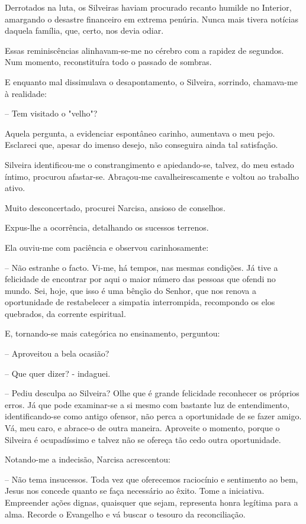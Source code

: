 \documentclass[portuguese,12pt,a4paper]{scrbook}
\begin{document}
	
	Derrotados na luta, os Silveiras haviam procurado recanto humilde no Interior, amargando o desastre financeiro em extrema penúria. Nunca mais tivera notícias daquela família, que, certo, nos devia odiar.
	
	Essas reminiscências alinhavam-se-me no cérebro com a rapidez de segundos. Num momento, reconstituíra todo o passado de sombras.
	
	E enquanto mal dissimulava o desapontamento, o Silveira, sorrindo, chamava-me à realidade:
	
	– Tem visitado o "velho"?
	
	Aquela pergunta, a evidenciar espontâneo carinho, aumentava o meu pejo. Esclareci que, apesar do imenso desejo, não conseguira ainda tal satisfação.
	
	Silveira identificou-me o constrangimento e apiedando-se, talvez, do meu estado íntimo, procurou afastar-se. Abraçou-me cavalheirescamente e voltou ao trabalho ativo.
	
	Muito desconcertado, procurei Narcisa, ansioso de conselhos.
	
	Expus-lhe a ocorrência, detalhando os sucessos terrenos.
	
	Ela ouviu-me com paciência e observou carinhosamente:
	
	– Não estranhe o facto. Vi-me, há tempos, nas mesmas condições. Já tive a felicidade de encontrar por aqui o maior número das pessoas que ofendi no mundo. Sei, hoje, que isso é uma bênção do Senhor, que nos renova a oportunidade de restabelecer a simpatia interrompida, recompondo os elos quebrados, da corrente espiritual.
	
	E, tornando-se mais categórica no ensinamento, perguntou:
	
	– Aproveitou a bela ocasião?
	
	– Que quer dizer? - indaguei.
	
	
	– Pediu desculpa ao Silveira? Olhe que é grande felicidade reconhecer os próprios erros. Já que pode examinar-se a si mesmo com bastante luz de entendimento, identificando-se como antigo ofensor, não perca a oportunidade de se fazer amigo. Vá, meu caro, e abrace-o de outra maneira. Aproveite o momento, porque o Silveira é ocupadíssimo e talvez não se ofereça tão cedo outra oportunidade.
	
	Notando-me a indecisão, Narcisa acrescentou:
	
	– Não tema insucessos. Toda vez que oferecemos raciocínio e sentimento ao bem, Jesus nos concede quanto se faça necessário ao êxito. Tome a iniciativa. Empreender ações dignas, quaisquer que sejam, representa honra legítima para a alma. Recorde o Evangelho e vá buscar o tesouro da reconciliação.
	
\end{document}
